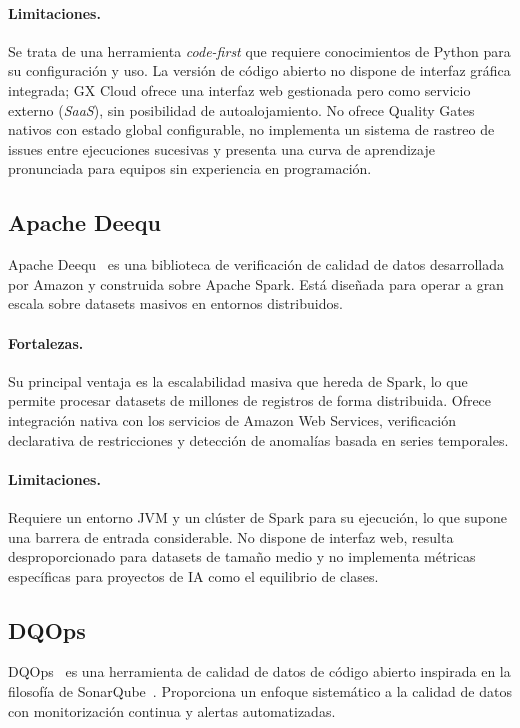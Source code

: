 \paragraph{Limitaciones.}
Se trata de una herramienta \emph{code-first} que requiere conocimientos de
Python para su configuración y uso. La versión de código abierto no dispone
de interfaz gráfica integrada; GX Cloud ofrece una interfaz web gestionada
pero como servicio externo (\emph{SaaS}), sin posibilidad de autoalojamiento.
No ofrece Quality Gates nativos con estado global configurable, no implementa
un sistema de rastreo de issues entre ejecuciones sucesivas y presenta una
curva de aprendizaje pronunciada para equipos sin experiencia en programación.

\subsection{Apache Deequ}
\label{sec:apache-deequ}

Apache Deequ~\citep{schelter2018} es una biblioteca de verificación de calidad
de datos desarrollada por Amazon y construida sobre Apache Spark. Está diseñada
para operar a gran escala sobre datasets masivos en entornos distribuidos.

\paragraph{Fortalezas.}
Su principal ventaja es la escalabilidad masiva que hereda de Spark, lo que
permite procesar datasets de millones de registros de forma distribuida.
Ofrece integración nativa con los servicios de Amazon Web Services, verificación
declarativa de restricciones y detección de anomalías basada en series
temporales.

\paragraph{Limitaciones.}
Requiere un entorno JVM y un clúster de Spark para su ejecución, lo que supone
una barrera de entrada considerable. No dispone de interfaz web, resulta
desproporcionado para datasets de tamaño medio y no implementa métricas
específicas para proyectos de \ac{IA} como el equilibrio de clases.

\subsection{DQOps}
\label{sec:dqops}

DQOps~\citep{dqops} es una herramienta de calidad de datos de código abierto
inspirada en la filosofía de SonarQube~\citep{sonarqube}. Proporciona un enfoque
sistemático a la calidad de datos con monitorización continua y alertas
automatizadas.


